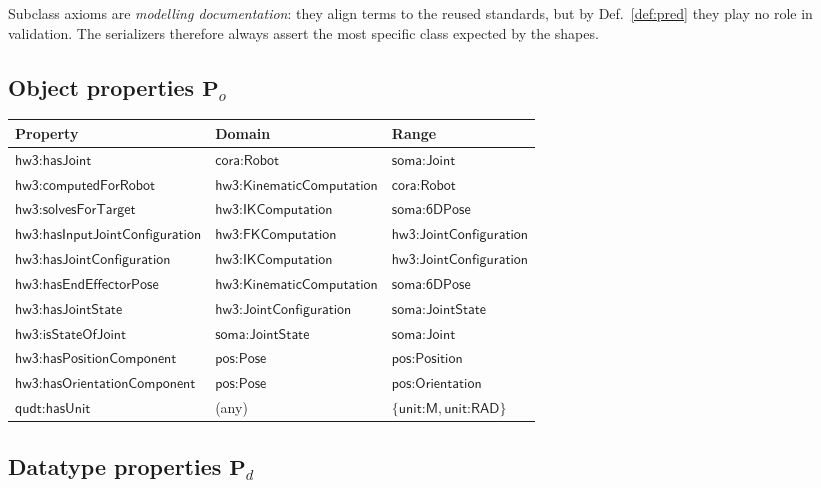 \documentclass[11pt,a4paper]{article}
\newcommand{\IRI}[1]{\textsf{#1}}                    %
\begin{document}
Subclass axioms are \emph{modelling documentation}: they align terms to the
reused standards, but by Def.~\ref{def:pred} they play
no role in validation. The serializers therefore always assert the most specific
class expected by the shapes.

\subsection{Object properties $\mathbf{P}_o$}

\begin{center}\footnotesize
\begin{tabular}{@{}lll@{}}
\toprule
Property & Domain & Range \\
\midrule
$\IRI{hw3{:}hasJoint}$ & $\IRI{cora{:}Robot}$ & $\IRI{soma{:}Joint}$ \\
$\IRI{hw3{:}computedForRobot}$ & $\IRI{hw3{:}KinematicComputation}$ & $\IRI{cora{:}Robot}$ \\
$\IRI{hw3{:}solvesForTarget}$ & $\IRI{hw3{:}IKComputation}$ & $\IRI{soma{:}6DPose}$ \\
$\IRI{hw3{:}hasInputJointConfiguration}$ & $\IRI{hw3{:}FKComputation}$ & $\IRI{hw3{:}JointConfiguration}$ \\
$\IRI{hw3{:}hasJointConfiguration}$ & $\IRI{hw3{:}IKComputation}$ & $\IRI{hw3{:}JointConfiguration}$ \\
$\IRI{hw3{:}hasEndEffectorPose}$ & $\IRI{hw3{:}KinematicComputation}$ & $\IRI{soma{:}6DPose}$ \\
$\IRI{hw3{:}hasJointState}$ & $\IRI{hw3{:}JointConfiguration}$ & $\IRI{soma{:}JointState}$ \\
$\IRI{hw3{:}isStateOfJoint}$ & $\IRI{soma{:}JointState}$ & $\IRI{soma{:}Joint}$ \\
$\IRI{hw3{:}hasPositionComponent}$ & $\IRI{pos{:}Pose}$ & $\IRI{pos{:}Position}$ \\
$\IRI{hw3{:}hasOrientationComponent}$ & $\IRI{pos{:}Pose}$ & $\IRI{pos{:}Orientation}$ \\
$\IRI{qudt{:}hasUnit}$ & (any) & $\{\IRI{unit{:}M}, \IRI{unit{:}RAD}\}$ \\
\bottomrule\end{tabular}
\end{center}

\subsection{Datatype properties $\mathbf{P}_d$}
\end{document}
